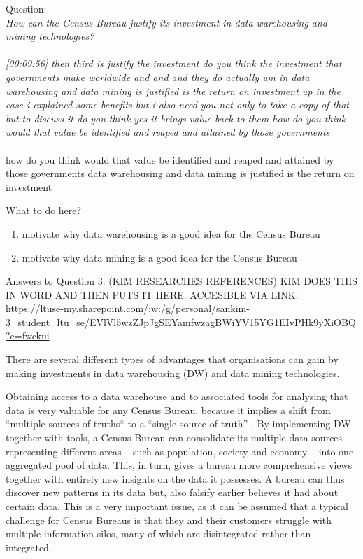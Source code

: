 Question:\\
\emph{
    How can the Census Bureau justify its investment in data warehousing and mining
technologies?
}\\\\

\emph{[00:09:56] then third is justify the investment do you think the investment that governments make worldwide
and and and they do actually um in data warehousing and data mining is justified is the return on investment
up in the case i explained some benefits but i also need you not only to take a copy of that but
to discuss it do you think yes it brings value back to them how do you think would that value be
identified and reaped and attained by those governments}\\\\
how do you think would that value be
identified and reaped and attained by those governments
data warehousing and data mining is justified is the return on investment

What to do here?
\begin{enumerate}
    \item motivate why data warehousing is a good idea for the Census Bureau
    \item motivate why data mining is a good idea for the Census Bureau
  \end{enumerate}

\newpage Answers to Question 3: (KIM RESEARCHES REFERENCES)
KIM DOES THIS IN WORD AND THEN PUTS IT HERE. ACCESIBLE VIA LINK:\\
\url{https://ltuse-my.sharepoint.com/:w:/g/personal/sankim-3_student_ltu_se/EVlVl5wzZJpJgSEYamfwzagBWiYV15YG1EIvPHk9yXiOBQ?e=fwckui}


There are several different types of advantages that organisations can gain by making investments in data warehousing (DW) and data mining technologies.


Obtaining access to a data warehouse and to associated tools for analysing that data is very valuable for any Census Bureau, 
because it implies a shift from “multiple sources of truths“ to a “single source of truth” \cite{l2video}. 
By implementing DW together with tools, a Census Bureau can consolidate its multiple data sources representing different areas -- 
such as population, society and economy -- into one aggregated pool of data. 
This, in turn, gives a bureau more comprehensive views together with entirely new insights on the data it possesses. 
A bureau can thus discover new patterns in its data but, also falsify earlier believes it had about certain data. 
This is a very important issue, 
as it can be assumed that a typical challenge for Census Bureaus is that they and their customers struggle with multiple information silos, 
many of which are disintegrated rather than integrated.


